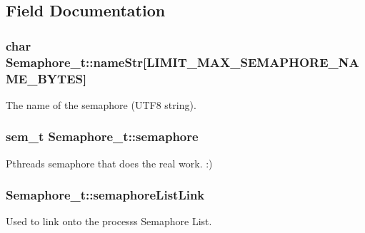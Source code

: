 \subsection{Field Documentation}
\subsubsection[{\texorpdfstring{name\+Str}{nameStr}}]{\setlength{\rightskip}{0pt plus 5cm}char Semaphore\+\_\+t\+::name\+Str\mbox{[}{\bf L\+I\+M\+I\+T\+\_\+\+M\+A\+X\+\_\+\+S\+E\+M\+A\+P\+H\+O\+R\+E\+\_\+\+N\+A\+M\+E\+\_\+\+B\+Y\+T\+ES}\mbox{]}}\hypertarget{struct_semaphore__t_aa80e31b44e94b0280c955b725a873741}{}\label{struct_semaphore__t_aa80e31b44e94b0280c955b725a873741}


The name of the semaphore (U\+T\+F8 string). 

\subsubsection[{\texorpdfstring{semaphore}{semaphore}}]{\setlength{\rightskip}{0pt plus 5cm}sem\+\_\+t Semaphore\+\_\+t\+::semaphore}\hypertarget{struct_semaphore__t_abb6744de577a9c7a4cc3c354552ed899}{}\label{struct_semaphore__t_abb6744de577a9c7a4cc3c354552ed899}


Pthreads semaphore that does the real work. \+:) 

\subsubsection[{\texorpdfstring{semaphore\+List\+Link}{semaphoreListLink}}]{ Semaphore\+\_\+t\+::semaphore\+List\+Link}\hypertarget{struct_semaphore__t_afb3944f86c4cca8dca30f0093e955f8f}{}\label{struct_semaphore__t_afb3944f86c4cca8dca30f0093e955f8f}


Used to link onto the process\textquotesingle{}s Semaphore List. 

